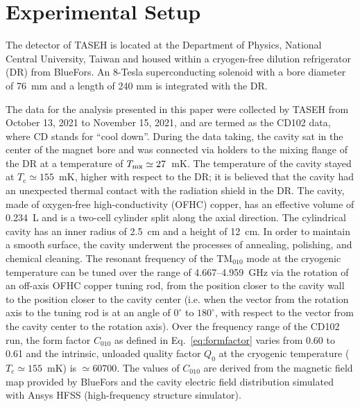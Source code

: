 
\section{Experimental Setup}\label{sec:taseh} 
The detector of TASEH is located at the Department of Physics, National 
Central University, Taiwan and housed within a cryogen-free dilution 
refrigerator (DR) from BlueFors. An 8-Tesla superconducting solenoid 
with a 
bore diameter of 76~mm and a length of 240 mm is integrated with the DR. 

The data for the analysis presented in this paper were collected by TASEH 
from October 13, 2021 to November 15, 2021, and are termed as the CD102 data, 
where CD stands for ``cool down''. 
During the data taking, the cavity sat in the center of the magnet bore 
and was connected via holders to the mixing flange of the DR at a 
temperature of $T_{\rm mx}\simeq27$~mK. 
The temperature of the cavity stayed at $T_\text{c}\simeq155$~mK, higher 
with respect to the 
DR; it is believed that the cavity had an unexpected thermal contact with the 
radiation shield in the DR. 
The cavity, made of oxygen-free high-conductivity (OFHC) copper, has an 
effective volume of 0.234~L and is a two-cell cylinder split along 
the axial direction. 
The cylindrical cavity has an inner radius of 2.5~cm and a 
height of 12~cm.  In order to maintain a smooth surface, the cavity underwent 
the processes of annealing, polishing, and chemical cleaning. The resonant 
frequency of the TM$_{010}$ mode at the cryogenic temperature 
can be tuned over the range of 
4.667--4.959~GHz via the rotation of an off-axis OFHC copper tuning rod, from 
the position closer to the cavity wall to the position closer to the cavity 
center (i.e. when the vector from the rotation axis to the tuning rod is 
at an angle of $0^\circ$ to $180^\circ$, with respect to the vector from the 
cavity center to the rotation axis). 
%
Over the frequency range of the CD102 run, the form factor $C_{010}$ as 
defined in Eq.~\eqref{eq:formfactor} varies from 0.60 to 0.61 and 
the intrinsic, unloaded quality factor $Q_0$ at the cryogenic temperature 
($T_\mathrm{c}\simeq 155$~mK) is $\simeq 60700$. 
The values of $C_{010}$ are derived from the magnetic field map provided by 
BlueFors and the cavity electric field distribution simulated with 
 Ansys HFSS (high-frequency structure simulator).  


